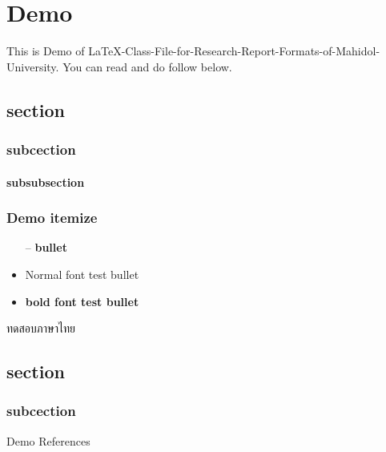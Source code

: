 \chapter{Demo}
This is Demo of LaTeX-Class-File-for-Research-Report-Formats-of-Mahidol-University. You can read and do follow below.
\section{section}
\subsection{subcection}
\subsubsection{subsubsection}

\subsection{Demo itemize}
\begin{itemize}[topsep=0pt,itemsep=-1ex,partopsep=1ex,parsep=1ex,leftmargin=0pt,
itemindent=2.4cm]
\item[--] \textbf{bullet}
\item Normal font test bullet
\item \textbf{bold font test bullet}
\end{itemize}

\begin{thai}
 ทดสอบภาษาไทย \\
\end{thai}

\section{section}
\subsection{subcection}
Demo References \cite{latexproject}

